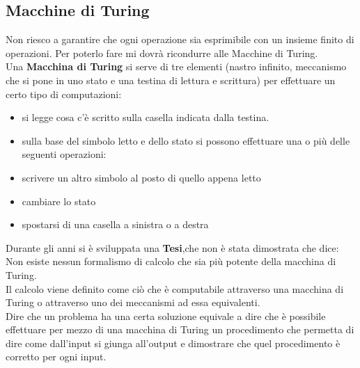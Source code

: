 \subsection{Macchine di Turing}
Non riesco a garantire che ogni operazione sia esprimibile con un insieme finito di operazioni. Per poterlo fare mi dovrà ricondurre alle Macchine di Turing.\\
Una \textbf{Macchina di Turing} si serve di tre elementi (nastro infinito, meccanismo che si pone in uno stato e una testina di lettura e scrittura) per effettuare un certo tipo di computazioni:
\begin{itemize}
    \itemsep1pt\parskip0pt
    \item si legge cosa c'è scritto sulla casella indicata dalla testina.
    \item sulla base del simbolo letto e dello stato si possono effettuare una o più delle seguenti operazioni:
    \item scrivere un altro simbolo al posto di quello appena letto
    \item cambiare lo stato
    \item spostarsi di una casella a sinistra o a destra
\end{itemize}

Durante gli anni si è sviluppata una \textbf{Tesi},che non è stata dimostrata che dice: Non esiste nessun formalismo di calcolo che sia più potente della macchina di Turing.\\
Il calcolo viene definito come ciò che è computabile attraverso una macchina di Turing o attraverso uno dei meccanismi ad essa equivalenti.\\
Dire che un problema ha una certa soluzione equivale a dire che è possibile effettuare per mezzo di una macchina di Turing un procedimento che permetta di dire come dall'input si giunga all'output e dimostrare che quel procedimento è corretto per ogni input.

